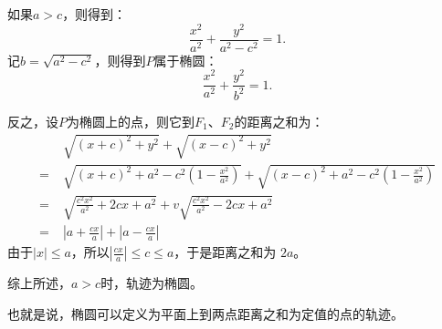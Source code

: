 \documentclass[12pt,UTF8,fontset=none]{ctexbook}
\begin{document}
如果$a > c$，则得到：
$$ \frac{x^2}{a^2} + \frac{y^2}{a^2 - c^2} = 1.$$
记$b = \sqrt{a^2 - c^2}$，则得到$P$属于椭圆：
$$ \frac{x^2}{a^2} + \frac{y^2}{b^2} = 1.$$

反之，设$P$为椭圆上的点，则它到$F_1$、$F_2$的距离之和为：
\begin{align*}
    &\;\sqrt{(x + c)^2 + y^2} + \sqrt{(x - c)^2 + y^2}  \\
    =&\;\sqrt{(x + c)^2 + a^2 - c^2\left(1 - \frac{x^2}{a^2}\right)} + \sqrt{(x - c)^2 + a^2 - c^2\left(1 - \frac{x^2}{a^2}\right)} \\
    =&\;\sqrt{\frac{c^2x^2}{a^2} + 2cx + a^2} + v\sqrt{\frac{c^2x^2}{a^2} - 2cx + a^2} \\
    =&\; \left|a + \frac{cx}{a}\right| + \left|a - \frac{cx}{a}\right|
\end{align*}
由于$|x| \leqslant a$，所以$\displaystyle\left|\frac{cx}{a}\right| \leqslant c \leqslant a$，于是距离之和为
$2a$。

综上所述，$a>c$时，轨迹为椭圆。

也就是说，椭圆可以定义为平面上到两点距离之和为定值的点的轨迹。
\end{document}
